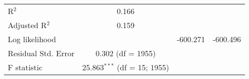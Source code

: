 \begin{attachment}
\begin{tabular}{lccc}
  R$^{2}$ & \multicolumn{1}{c}{0.166} &  &  \\ 
  Adjusted R$^{2}$ & \multicolumn{1}{c}{0.159} &  &  \\ 
  Log likelihood &  & \multicolumn{1}{c}{-600.271} & \multicolumn{1}{c}{-600.496} \\ 
  Residual Std. Error & \multicolumn{1}{c}{0.302 (df = 1955)} &  &  \\ 
  F statistic & \multicolumn{1}{c}{25.863$^{***}$ (df = 15; 1955)} &  &  \\ 
  \bottomrule 
  \end{tabular} 
\end{attachment}
